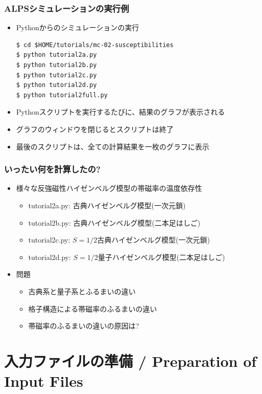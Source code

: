 \begin{frame}[t,fragile]
  \frametitle{ALPSシミュレーションの実行例}
  \begin{itemize}
    \item Pythonからのシミュレーションの実行
\begin{lstlisting}
$ cd $HOME/tutorials/mc-02-susceptibilities
$ python tutorial2a.py
$ python tutorial2b.py
$ python tutorial2c.py
$ python tutorial2d.py
$ python tutorial2full.py
\end{lstlisting}
    \item Pythonスクリプトを実行するたびに、結果のグラフが表示される
    \item グラフのウィンドウを閉じるとスクリプトは終了
    \item 最後のスクリプトは、全ての計算結果を一枚のグラフに表示
  \end{itemize}
\end{frame}

\begin{frame}[t,fragile]
  \frametitle{いったい何を計算したの?}
  \begin{itemize}
  \item 様々な反強磁性ハイゼンベルグ模型の帯磁率の温度依存性
    \begin{itemize}
    \item tutorial2a.py: 古典ハイゼンベルグ模型(一次元鎖)
    \item tutorial2b.py: 古典ハイゼンベルグ模型(二本足はしご)
    \item tutorial2c.py: $S=1/2$古典ハイゼンベルグ模型(一次元鎖)
    \item tutorial2d.py: $S=1/2$量子ハイゼンベルグ模型(二本足はしご)
    \end{itemize}
  \item 問題
    \begin{itemize}
      \item 古典系と量子系とふるまいの違い
      \item 格子構造による帯磁率のふるまいの違い
      \item 帯磁率のふるまいの違いの原因は?
    \end{itemize}
  \end{itemize}
\end{frame}

\section{入力ファイルの準備 / Preparation of Input Files}
\subsection*{\redb\whiteb\greenb}

